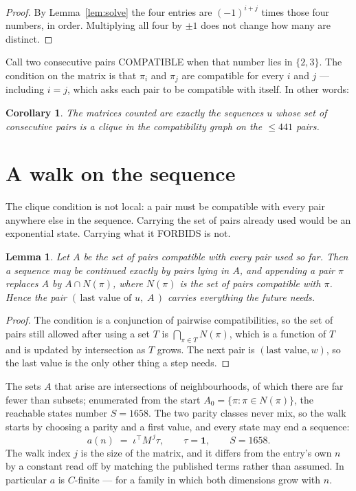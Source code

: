 \documentclass[11pt,a4paper]{article}
\theoremstyle{plain}
\newtheorem{lemma}[theorem]{Lemma}
\newtheorem{corollary}[theorem]{Corollary}
\theoremstyle{definition}
\begin{document}
\begin{proof}
By Lemma~\ref{lem:solve} the four entries are $(-1)^{i+j}$ times those four numbers, in
order. Multiplying all four by $\pm1$ does not change how many are distinct.
\end{proof}

Call two consecutive pairs COMPATIBLE when that number lies in $\{2,3\}$. The condition on the
matrix is that $\pi_i$ and $\pi_j$ are compatible for every $i$ and $j$ --- including $i=j$,
which asks each pair to be compatible with itself. In other words:

\begin{corollary}
The matrices counted are exactly the sequences $u$ whose set of consecutive pairs is a clique in
the compatibility graph on the $\le 441$ pairs.
\end{corollary}

\section{A walk on the sequence}

The clique condition is not local: a pair must be compatible with every pair anywhere else in
the sequence. Carrying the set of pairs already used would be an exponential state. Carrying
what it FORBIDS is not.

\begin{lemma}\label{lem:lump}
Let $A$ be the set of pairs compatible with every pair used so far. Then a sequence may be
continued exactly by pairs lying in $A$, and appending a pair $\pi$ replaces $A$ by
$A\cap N(\pi)$, where $N(\pi)$ is the set of pairs compatible with $\pi$. Hence the pair
$(\,\text{last value of }u,\;A\,)$ carries everything the future needs.
\end{lemma}

\begin{proof}
The condition is a conjunction of pairwise compatibilities, so the set of pairs still allowed
after using a set $T$ is $\bigcap_{\pi\in T}N(\pi)$, which is a function of $T$ and is updated
by intersection as $T$ grows. The next pair is $(\text{last value},w)$, so the last value is
the only other thing a step needs.
\end{proof}

The sets $A$ that arise are intersections of neighbourhoods, of which there are far fewer than
subsets; enumerated from the start $A_0=\{\pi:\pi\in N(\pi)\}$, the reachable states number
$S=1658$. The two parity classes never mix, so the walk starts by choosing a parity and a first
value, and every state may end a sequence:
\[
a(n)\;=\;\iota^{\!\top}M^{\,j}\tau ,\qquad \tau=\mathbf{1},\qquad S=1658.
\]
The walk index $j$ is the size of the matrix, and it differs from the entry's own $n$ by a
constant read off by matching the published terms rather than assumed. In particular $a$ is
$C$-finite --- for a family in which both dimensions grow with $n$.
\end{document}
